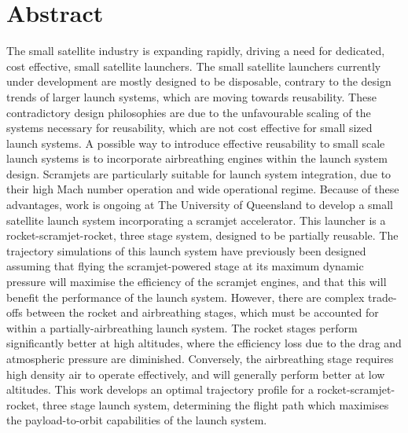 \cleardoublepage

\section*{Abstract}

 The small satellite industry is expanding rapidly, driving a need for dedicated, cost effective, small satellite launchers. The small satellite launchers currently under development are mostly designed to be disposable,  contrary to the design trends of larger launch systems, which are moving towards reusability. These contradictory design philosophies are due to the unfavourable scaling of the systems necessary for reusability, which are not cost effective for small sized launch systems. 
 A possible way to introduce effective reusability to small scale launch systems is to incorporate airbreathing engines within the launch system design. Scramjets are particularly suitable for launch system integration, due to their high Mach number operation and wide operational regime. 
 Because of these advantages, work is ongoing at The University of Queensland to develop a small satellite launch system incorporating a scramjet accelerator. This launcher is a rocket-scramjet-rocket, three stage system, designed to be partially reusable. 
 The trajectory simulations of this launch system have previously been designed assuming that flying the scramjet-powered stage at its maximum dynamic pressure will maximise the efficiency of the scramjet engines, and that this will benefit the performance of the launch system. 
 However, there are complex trade-offs between the rocket and airbreathing stages, which must be accounted for within a partially-airbreathing launch system. The rocket stages perform significantly better at high altitudes, where the efficiency loss due to the drag and atmospheric pressure are diminished. Conversely, the airbreathing stage requires high density air to operate effectively, and will generally perform better at low altitudes. 
 This work develops an optimal trajectory profile for a rocket-scramjet-rocket, three stage launch system, determining the flight path which maximises the payload-to-orbit capabilities of the launch system. 
 
